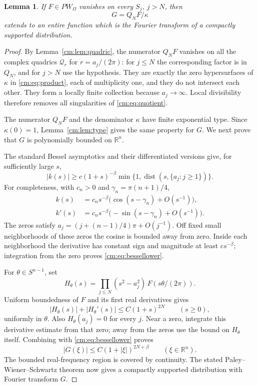 \documentclass[a4paper,12pt,reqno]{amsart}
\newtheorem{lemma}[theorem]{Lemma}
\theoremstyle{remark}
\numberwithin{equation}{section}
\newcommand{\R}{\mathbb R}
\DeclareMathOperator{\dist}{dist}
\begin{document}
\begin{lemma}\label{cm:lem:division}
If $F\in PW_\Omega$ vanishes on every $S_j$, $j>N$, then
\begin{equation}\label{cm:eq:quotient}
 G=Q_NF/\kappa
\end{equation}
extends to an entire function which is the Fourier transform of a
compactly supported distribution.
\end{lemma}

\begin{proof}
By Lemma~\ref{cm:lem:quadric}, the numerator $Q_NF$ vanishes on all
the complex quadrics $\mathcal Q_r$ for
$r=a_j/(2\pi)$: for $j\leq N$ the corresponding factor is in
$Q_N$, and for $j>N$ use the hypothesis.
They are exactly the zero hypersurfaces of $\kappa$ in
\eqref{cm:eq:product}, each of multiplicity one, and they do not
intersect each other. They form a locally finite collection because
$a_j\longrightarrow\infty$. Local divisibility therefore removes
all singularities of \eqref{cm:eq:quotient}.

The numerator $Q_NF$ and the denominator $\kappa$ have finite
exponential type. Since $\kappa(0)=1$, Lemma~\ref{cm:lem:type}
gives the same property for $G$. We next prove that $G$ is
polynomially bounded on $\R^n$.

The standard Bessel asymptotics and their differentiated versions
give, for sufficiently large $s$,
\begin{equation}\label{cm:eq:bessellower}
 |k(s)|\geq c(1+s)^{-\beta}
           \min\{1,\dist(s,\{a_j:j\geq1\})\}.
\end{equation}
For completeness, with $c_n>0$ and $\gamma_n=\pi(n+1)/4$,
\[
 \begin{aligned}
 k(s)&=c_n s^{-\beta}\bigl(\cos(s-\gamma_n)+O(s^{-1})\bigr),\\
 k'(s)&=c_n s^{-\beta}\bigl(-\sin(s-\gamma_n)+O(s^{-1})\bigr).
 \end{aligned}
\]
The zeros satisfy $a_j=(j+(n-1)/4)\pi+O(j^{-1})$.
Off fixed small neighborhoods of these zeros the cosine is bounded
away from zero. Inside each neighborhood the derivative has constant
sign and magnitude at least $c s^{-\beta}$; integration from the
zero proves \eqref{cm:eq:bessellower}.

For $\theta\in S^{n-1}$, set
\[
 H_\theta(s)=\prod_{j\leq N}(s^2-a_j^2)\,
                       F(s\theta/(2\pi)).
\]
Uniform boundedness of $F$ and its first real derivatives gives
\[
 |H_\theta(s)|+|H_\theta'(s)|\leq C(1+s)^{2N}
                      \qquad(s\geq0),
\]
uniformly in $\theta$. Also $H_\theta(a_j)=0$ for every $j$.
Near a zero, integrate this derivative estimate from that zero;
away from the zeros use the bound on $H_\theta$ itself. Combining
with \eqref{cm:eq:bessellower} proves
\[
 |G(\xi)|\leq C(1+|\xi|)^{2N+\beta}\qquad(\xi\in\R^n).
\]
The bounded real-frequency region is covered by continuity.
The stated Paley--Wiener--Schwartz theorem now gives a compactly
supported distribution with Fourier transform $G$.
\end{proof}
\end{document}
